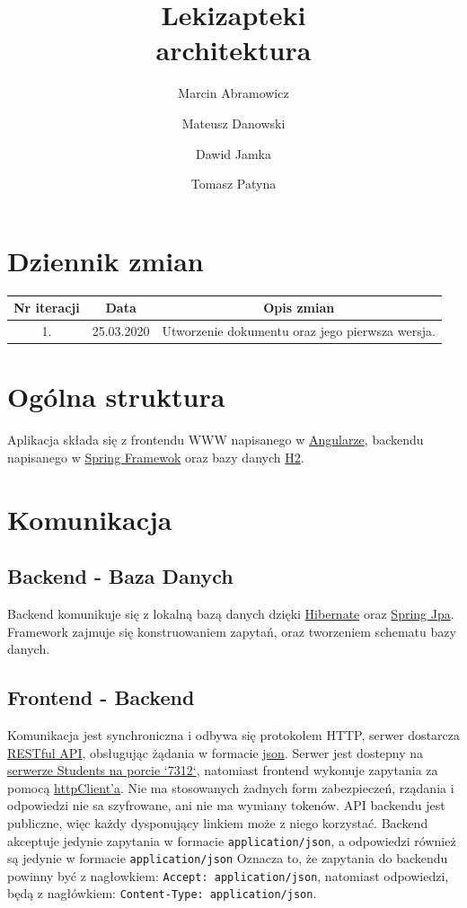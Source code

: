 \documentclass{article}
\title{
Lekizapteki\\
\large architektura}
\author{Marcin Abramowicz \and Mateusz Danowski \and Dawid Jamka \and Tomasz Patyna}
\begin{document}
  \maketitle

  \section{Dziennik zmian}
    \begin{tabular}{|c|c|c|}
      Nr iteracji & Data & Opis zmian \\
      \hline
      1. & 25.03.2020 & Utworzenie dokumentu oraz jego pierwsza wersja. \\
    \end{tabular}

  \section{Ogólna struktura}
    Aplikacja składa się z frontendu WWW napisanego w
    \href{https://angular.io}{Angularze}, backendu napisanego w
    \href{https://spring.io}{Spring Framewok} oraz bazy danych
    \href {https://www.h2database.com/html/main.html}{H2}.

  \section{Komunikacja}
    \subsection{Backend - Baza Danych}
    Backend komunikuje się z lokalną bazą danych dzięki
    \href{https://hibernate.org}{Hibernate} oraz
    \href{https://spring.io/projects/spring-data-jpa} {Spring Jpa}.
    Framework zajmuje się konstruowaniem zapytań, oraz tworzeniem schematu bazy danych.

    \subsection{Frontend - Backend}
    Komunikacja jest synchroniczna i odbywa się protokołem HTTP, serwer dostarcza
    \href{https://en.wikipedia.org/wiki/Representational_state_transfer}{RESTful API},
    obsługując żądania w formacie
    \href{https://en.wikipedia.org/wiki/JSON}{json}.
    Serwer jest dostepny na
    \href{http://students.mimuw.edu.pl:7312}{serwerze Students na porcie `7312`},
    natomiast frontend wykonuje zapytania za pomocą
    \href{https://angular.io/guide/http}{httpClient'a}.
    Nie ma stosowanych żadnych form zabezpieczeń, rządania i odpowiedzi nie sa szyfrowane, ani nie ma wymiany tokenów.
    API backendu jest publiczne, więc każdy dysponujący linkiem może z niego korzystać.
    Backend akceptuje jedynie zapytania w formacie \texttt{application/json},
    a odpowiedzi również są jedynie w formacie \texttt{application/json}
    Oznacza to, że zapytania do backendu powinny być z nagłowkiem: \texttt{Accept: application/json},
    natomiast odpowiedzi, będą z nagłówkiem: \texttt{Content-Type: application/json}.
\end{document}
